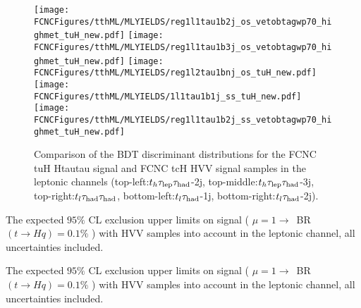 \begin{figure}[htb]
  \centering
  \texttt{[image: \\FCNCFigures/tthML/MLYIELDS/reg1l1tau1b2j\_os\_vetobtagwp70\_highmet\_tuH\_new.pdf]}
  \texttt{[image: \\FCNCFigures/tthML/MLYIELDS/reg1l1tau1b3j\_os\_vetobtagwp70\_highmet\_tuH\_new.pdf]}
  \texttt{[image: \\FCNCFigures/tthML/MLYIELDS/reg1l2tau1bnj\_os\_tuH\_new.pdf]}
  \\
  \texttt{[image: \\FCNCFigures/tthML/MLYIELDS/1l1tau1b1j\_ss\_tuH\_new.pdf]}
  \texttt{[image: \\FCNCFigures/tthML/MLYIELDS/reg1l1tau1b2j\_ss\_vetobtagwp70\_highmet\_tuH\_new.pdf]}
\\
\caption{ Comparison of the BDT discriminant distributions for the FCNC tuH Htautau signal and FCNC tcH HVV signal samples in the leptonic channels
  (top-left:$t_h\tau_\text{lep}{}\tau_\text{had}$-2j, top-middle:$t_h\tau_\text{lep}{}\tau_\text{had}$-3j, top-right:$t_l\tau_\text{had}{}\tau_\text{had}$, bottom-left:$t_l\tau_\text{had}$-1j, bottom-right:$t_l\tau_\text{had}$-2j).}
\label{fig:BDT_tuH_HWW}
\end{figure}



\begin{table}[htb]
\caption{The expected $95\%$ CL exclusion upper limits on signal ( $\mu=1\to$~BR$(t\to Hq)=0.1\%$ ) with HVV samples into account in the leptonic channel, all uncertainties included.}
\label{tab:ml_limit}

\end{table}

\begin{table}[htb]
\caption{The expected $95\%$ CL exclusion upper limits on signal ( $\mu=1\to$~BR$(t\to Hq)=0.1\%$ ) with HVV samples into account in the leptonic channel, all uncertainties included.}
\label{tab:ml_yields}

\end{table}



\clearpage


